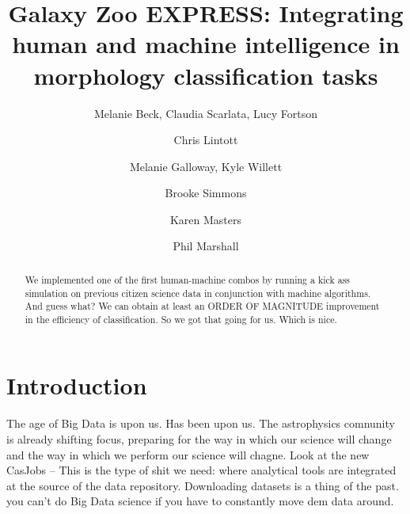 \documentclass[twocolumn]{aastex6}
\begin{document}
\title{Galaxy Zoo EXPRESS: Integrating human and machine intelligence in morphology classification tasks}


\author{Melanie Beck, Claudia Scarlata, Lucy Fortson}%
\author{Chris Lintott}
\author{Melanie Galloway, Kyle Willett}
\author{Brooke Simmons}
\author{Karen Masters}
\author{Phil Marshall}


\begin{abstract}

We implemented one of the first human-machine combos by running a kick ass
simulation on previous citizen science data in conjunction with machine algorithms. 
And guess what? We can obtain at least an ORDER OF MAGNITUDE improvement in the 
efficiency of classification. So we got that going for us. Which is nice. 

\end{abstract}



\section{Introduction} \label{sec:intro}
The age of Big Data is upon us. Has been upon us. The astrophysics comnunity is 
already shifting focus, preparing for the way in which our science will change and 
the way in which we perform our science will chagne. Look at the new CasJobs -- 
This is the type of shit we need: where analytical tools are integrated at the source
of the data repository. Downloading datasets is a thing of the past. you can't do 
Big Data science if you have to constantly move dem data around. 
\end{document}
